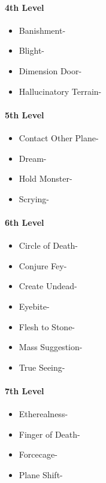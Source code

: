 \documentclass[
]{article}
\providecommand{\tightlist}{%
  \setlength{\itemsep}{0pt}\setlength{\parskip}{0pt}}
\begin{document}
\hypertarget{4th-level-6}{%
\paragraph{4th Level}\label{4th-level-6}}

\begin{itemize}
\tightlist
\item
  Banishment-
\item
  Blight-
\item
  Dimension Door-
\item
  Hallucinatory Terrain-
\end{itemize}

\hypertarget{5th-level-6}{%
\paragraph{5th Level}\label{5th-level-6}}

\begin{itemize}
\tightlist
\item
  Contact Other Plane-
\item
  Dream-
\item
  Hold Monster-
\item
  Scrying-
\end{itemize}

\hypertarget{6th-level-4}{%
\paragraph{6th Level}\label{6th-level-4}}

\begin{itemize}
\tightlist
\item
  Circle of Death-
\item
  Conjure Fey-
\item
  Create Undead-
\item
  Eyebite-
\item
  Flesh to Stone-
\item
  Mass Suggestion-
\item
  True Seeing-
\end{itemize}

\hypertarget{7th-level-4}{%
\paragraph{7th Level}\label{7th-level-4}}

\begin{itemize}
\tightlist
\item
  Etherealness-
\item
  Finger of Death-
\item
  Forcecage-
\item
  Plane Shift-
\end{itemize}
\end{document}
